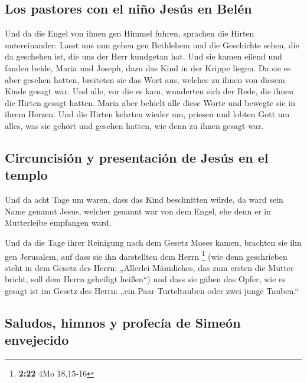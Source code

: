 \hypertarget{los-pastores-con-el-niuxf1o-jesuxfas-en-beluxe9n}{%
\subsection{Los pastores con el niño Jesús en
Belén}\label{los-pastores-con-el-niuxf1o-jesuxfas-en-beluxe9n}}

 Und da die Engel von ihnen gen Himmel fuhren, sprachen
die Hirten untereinander: Lasst uns nun gehen gen Bethlehem und die
Geschichte sehen, die da geschehen ist, die uns der Herr kundgetan hat.
 Und sie kamen eilend und fanden beide, Maria und Joseph,
dazu das Kind in der Krippe liegen.  Da sie es aber
gesehen hatten, breiteten sie das Wort aus, welches zu ihnen von diesem
Kinde gesagt war.  Und alle, vor die es kam, wunderten
sich der Rede, die ihnen die Hirten gesagt hatten.  Maria
aber behielt alle diese Worte und bewegte sie in ihrem Herzen.
 Und die Hirten kehrten wieder um, priesen und lobten
Gott um alles, was sie gehört und gesehen hatten, wie denn zu ihnen
gesagt war.

\hypertarget{circuncisiuxf3n-y-presentaciuxf3n-de-jesuxfas-en-el-templo}{%
\subsection{Circuncisión y presentación de Jesús en el
templo}\label{circuncisiuxf3n-y-presentaciuxf3n-de-jesuxfas-en-el-templo}}

 Und da acht Tage um waren, dass das Kind beschnitten
würde, da ward sein Name genannt Jesus, welcher genannt war von dem
Engel, ehe denn er in Mutterleibe empfangen ward.

 Und da die Tage ihrer Reinigung nach dem Gesetz Moses
kamen, brachten sie ihn gen Jerusalem, auf dass sie ihn darstellten dem
Herrn \footnote{\textbf{2:22} 4Mo 18,15-16}  (wie denn
geschrieben steht in dem Gesetz des Herrn: „Allerlei Männliches, das zum
ersten die Mutter bricht, soll dem Herrn geheiligt heißen``)
 und dass sie gäben das Opfer, wie es gesagt ist im
Gesetz des Herrn: „ein Paar Turteltauben oder zwei junge Tauben.``

\hypertarget{saludos-himnos-y-profecuxeda-de-simeuxf3n-envejecido}{%
\subsection{Saludos, himnos y profecía de Simeón
envejecido}\label{saludos-himnos-y-profecuxeda-de-simeuxf3n-envejecido}}

